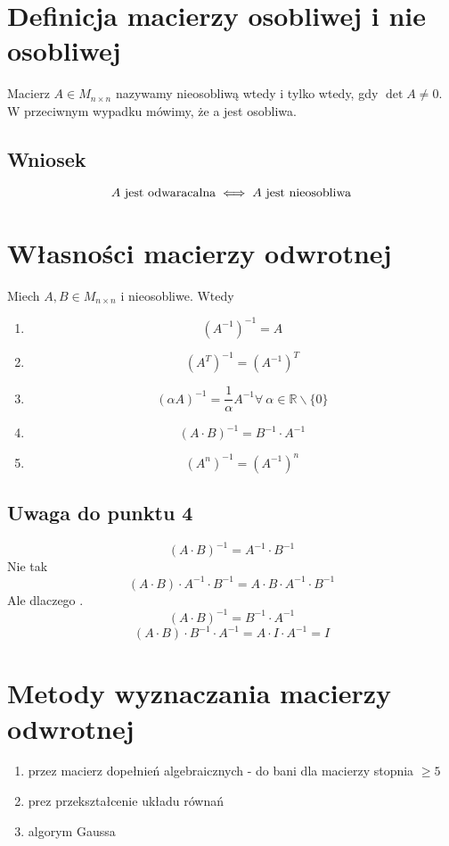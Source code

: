 \documentclass[11pt]{article}
\begin{document}
\section{Definicja macierzy osobliwej i nie osobliwej}
Macierz $A \in M_{n \times n}$ nazywamy nieosobliwą wtedy i tylko wtedy, gdy $\det{A} \not = 0$. W przeciwnym wypadku mówimy, że a jest osobliwa.
\subsection{Wniosek}
$$ A \hbox{ jest odwaracalna} \iff A \hbox{ jest nieosobliwa} $$

\section{Własności macierzy odwrotnej}
Miech $A,B \in M_{n \times n}$ i nieosobliwe. Wtedy \\
\begin{enumerate}
\item{ $$ (A^{-1})^{-1} = A $$}
\item{ $$ (A^{T})^{-1} = (A^{-1})^{T}$$}
\item{ $$ (\alpha A)^{-1} = \frac{1}{\alpha} A^{-1} \forall\ \alpha \in \mathbb{R} \backslash \{0\}$$}
\item{ $$ (A \cdot B)^{-1} = B^{-1} \cdot A^{-1} $$}
\item{ $$ (A^n)^{-1} = (A^{-1})^n $$}
\end{enumerate}

\subsection{ Uwaga do punktu 4 }
$$ (A \cdot B)^{-1} = A^{-1} \cdot B^{-1} $$ Nie tak
$$ (A \cdot B) \cdot A^{-1} \cdot B^{-1} = A \cdot B \cdot A^{-1} \cdot B^{-1} $$
Ale dlaczego .
$$(A \cdot B)^{-1} = B^{-1} \cdot A^{-1} $$
$$(A \cdot B) \cdot B^{-1} \cdot A^{-1} = A \cdot I \cdot A^{-1} = I$$
\section{Metody wyznaczania macierzy odwrotnej}
\begin{enumerate}
\item{przez macierz dopełnień algebraicznych - do bani dla macierzy stopnia $\geq 5$}
\item{prez przekształcenie układu równań}
\item{algorym Gaussa}
\end{enumerate}
\end{document}
